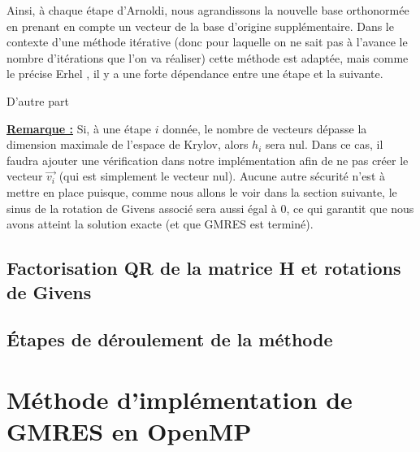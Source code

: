 \documentclass[11pt,a4paper,oneside]{memoir}
\theoremstyle{definition}
\theoremstyle{remark}
\theoremstyle{plain}
\begin{document}
Ainsi, à chaque étape d'Arnoldi, nous agrandissons la nouvelle base orthonormée en prenant en compte un vecteur de la base d'origine supplémentaire. Dans le contexte d'une méthode itérative (donc pour laquelle on ne sait pas à l'avance le nombre d'itérations que l'on va réaliser) cette méthode est adaptée, mais comme le précise Erhel \cite{erhel95}, il y a une forte dépendance entre une étape et la suivante.\medskip

D'autre part

%
%
%
%
%
%





\underline{\textbf{Remarque :}} Si, à une étape $i$ donnée, le nombre de vecteurs dépasse la dimension maximale de l'espace de Krylov, alors $h_i$ sera nul. Dans ce cas, il faudra ajouter une vérification dans notre implémentation afin de ne pas créer le vecteur $\vec{v_i}$ (qui est simplement le vecteur nul). Aucune autre sécurité n'est à mettre en place puisque, comme nous allons le voir dans la section suivante, le sinus de la rotation de Givens associé sera aussi égal à $0$, ce qui garantit que nous avons atteint la solution exacte (et que GMRES est terminé). 

\subsection{Factorisation QR de la matrice H et rotations de Givens}


\subsection{\'Etapes de déroulement de la méthode}




\section{Méthode d'implémentation de GMRES en OpenMP}
\end{document}

